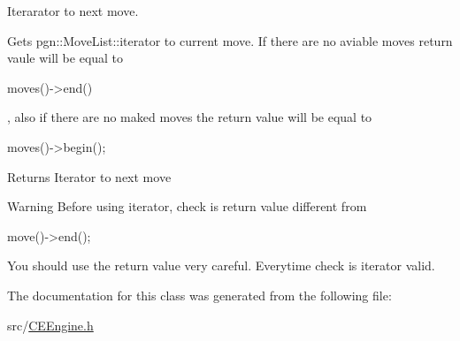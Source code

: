 Iterarator to next move. 

Gets pgn::MoveList::iterator to current move. If there are no aviable moves return vaule will be equal to 
\begin{DoxyCode}
 moves()->end()
\end{DoxyCode}
, also if there are no maked moves the return value will be equal to 
\begin{DoxyCode}
 moves()->begin(); 
\end{DoxyCode}
 \begin{DoxyReturn}{Returns}
Iterator to next move 
\end{DoxyReturn}
\begin{DoxyWarning}{Warning}
Before using iterator, check is return value different from 
\begin{DoxyCode}
 move()->end(); 
\end{DoxyCode}
 

You should use the return value very careful. Everytime check is iterator valid. 
\end{DoxyWarning}


The documentation for this class was generated from the following file:\begin{DoxyCompactItemize}
\item 
src/\hyperlink{CEEngine_8h}{CEEngine.h}\end{DoxyCompactItemize}
